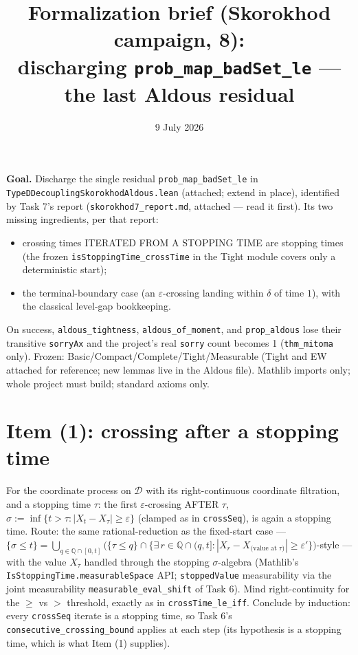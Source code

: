 \documentclass[11pt]{article}
\title{Formalization brief (Skorokhod campaign, 8):\\
discharging \texttt{prob\_map\_badSet\_le} --- the last Aldous residual}
\date{9 July 2026}
\theoremstyle{plain}
\theoremstyle{remark}
\newcommand{\D}{\mathcal D}\newcommand{\eps}{\varepsilon}\newcommand{\Q}{\mathbb Q}
\begin{document}
\maketitle

\noindent\textbf{Goal.} Discharge the single residual
\texttt{prob\_map\_badSet\_le} in
\texttt{TypeDDecouplingSkorokhodAldous.lean} (attached; extend in place),
identified by Task 7's report (\texttt{skorokhod7\_report.md}, attached ---
read it first). Its two missing ingredients, per that report:
\begin{itemize}
\item[(1)] crossing times ITERATED FROM A STOPPING TIME are stopping times
(the frozen \texttt{isStoppingTime\_crossTime} in the Tight module covers
only a deterministic start);
\item[(2)] the terminal-boundary case (an $\eps$-crossing landing within
$\delta$ of time $1$), with the classical level-gap bookkeeping.
\end{itemize}
On success, \texttt{aldous\_tightness}, \texttt{aldous\_of\_moment}, and
\texttt{prop\_aldous} lose their transitive \texttt{sorryAx} and the
project's real \texttt{sorry} count becomes 1 (\texttt{thm\_mitoma} only).
Frozen: Basic/Compact/Complete/Tight/Measurable (Tight and EW attached for
reference; new lemmas live in the Aldous file). Mathlib imports only; whole
project must build; standard axioms only.

\section*{Item (1): crossing after a stopping time}

For the coordinate process on $\D$ with its right-continuous coordinate
filtration, and a stopping time $\tau$: the first $\eps$-crossing AFTER
$\tau$,
$\sigma:=\inf\{t>\tau:|X_t-X_\tau|\ge\eps\}$ (clamped as in
\texttt{crossSeq}), is again a stopping time. Route: the same
rational-reduction as the fixed-start case ---
$\{\sigma\le t\}=\bigcup_{q\in\Q\cap[0,t]}\big(\{\tau\le q\}\cap
\{\exists\,r\in\Q\cap(q,t]:|X_r-X_{\text{(value at }\tau)}|\ge\eps'\}\big)$-style
--- with the value $X_\tau$ handled through the stopping $\sigma$-algebra
(Mathlib's \texttt{IsStoppingTime.measurableSpace} API; \texttt{stoppedValue}
measurability via the joint measurability \texttt{measurable\_eval\_shift}
of Task 6). Mind right-continuity for the $\ge$ vs $>$ threshold, exactly as
in \texttt{crossTime\_le\_iff}. Conclude by induction: every
\texttt{crossSeq} iterate is a stopping time, so Task 6's
\texttt{consecutive\_crossing\_bound} applies at each step (its hypothesis
is a stopping time, which is what Item (1) supplies).
\end{document}
